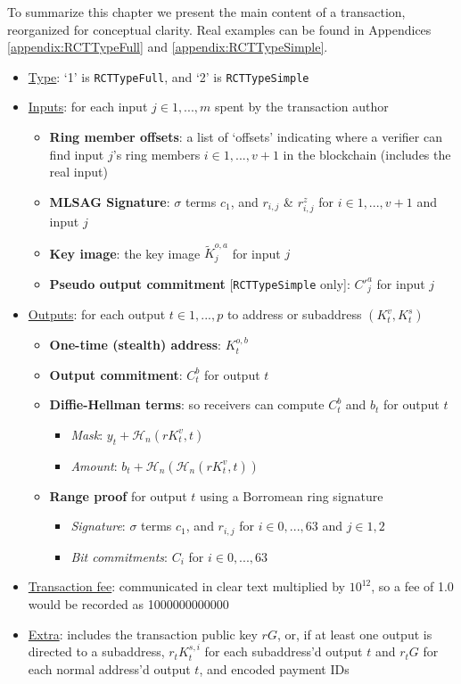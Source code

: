 To summarize this chapter we present the main content of a transaction, reorganized for conceptual clarity. Real examples can be found in Appendices \ref{appendix:RCTTypeFull} and \ref{appendix:RCTTypeSimple}.

\begin{itemize}
    \item \underline{Type}: `1' is {\tt RCTTypeFull}, and `2' is {\tt RCTTypeSimple}
    \item \underline{Inputs}: for each input $j \in 1,...,m$ spent by the transaction author
    \begin{itemize}
        \item \textbf{Ring member offsets}: a list of `offsets' indicating where a verifier can find input $j$'s ring members $i \in 1,...,v+1$ in the blockchain (includes the real input)
        \item \textbf{MLSAG Signature}: $\sigma$ terms $c_1$, and $r_{i,j}$ \& $r^{z}_{i,j}$ for $i \in 1,...,v+1$ and input $j$
        \item \textbf{Key image}: the key image $\tilde{K}^{o,a}_j$ for input $j$
        \item \textbf{Pseudo output commitment} {[{\tt RCTTypeSimple} only]}: $C'^{a}_j$ for input $j$
    \end{itemize}
    
    \item \underline{Outputs}: for each output $t \in 1,...,p$ to address or subaddress $(K^v_t,K^s_t)$
    \begin{itemize}
        \item \textbf{One-time (stealth) address}: $K^{o,b}_t$
        \item \textbf{Output commitment}: $C^{b}_t$ for output $t$
        \item \textbf{Diffie-Hellman terms}: so receivers can compute $C^{b}_t$ and $b_t$ for output $t$
        \begin{itemize}
            \item \textit{Mask}: $y_t + \mathcal{H}_n(r K^v_t,t)$
            \item \textit{Amount}: $b_t + \mathcal{H}_n(\mathcal{H}_n(r K^v_t,t))$
        \end{itemize}
        \item \textbf{Range proof} for output $t$ using a Borromean ring signature
        \begin{itemize}
            \item \textit{Signature}: $\sigma$ terms $c_1$, and $r_{i,j}$ for $i \in 0,...,63$ and $j \in 1,2$
            \item \textit{Bit commitments}: $C_i$ for $i \in 0,...,63$
        \end{itemize}
    \end{itemize}
    \item \underline{Transaction fee}: communicated in clear text multiplied by $10^{12}$, so a fee of 1.0 would be recorded as 1000000000000
    \item \underline{Extra}: includes the transaction public key $r G$, or, if at least one output is directed to a subaddress, $r_t K^{s,i}_t$ for each subaddress'd output $t$ and $r_t G$ for each normal address'd output $t$, and encoded payment IDs
\end{itemize}
